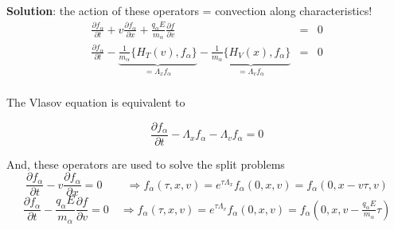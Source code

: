\documentclass{beamer}
\begin{document}

\begin{frame}{\subsecname}
\vspace*{-2mm} 
\textbf{Solution}: the action of these operators = convection along characteristics!
\begin{eqnarray*}
\frac{\partial f_{\alpha}}{\partial t} + v\frac{\partial f_{\alpha}}{\partial x} + \frac{q_{\alpha}E}{m_{\alpha}}\frac{\partial f}{\partial v} & = & 0 \\
\frac{\partial f_{\alpha}}{\partial t} - \underbrace{\frac{1}{m_{\alpha}}\{H_T(v),f_{\alpha}\}}_{= \Lambda_xf_{\alpha}} -  \underbrace{\frac{1}{m_{\alpha}}\{H_V(x),f_{\alpha}\}}_{= \Lambda_vf_{\alpha}}  & = & 0 \\
\end{eqnarray*}

\vspace*{-3.5mm}The Vlasov equation is equivalent to

$$\frac{\partial f_{\alpha}}{\partial t} - \Lambda_xf_{\alpha} -  \Lambda_vf_{\alpha}   =  0 $$

And, these operators are used to solve the split problems
$$\frac{\partial f_{\alpha}}{\partial t} - v\frac{\partial f_{\alpha}}{\partial x}  =  0  \qquad\, \Rightarrow  f_{\alpha}(\tau ,x,v) = e^{\tau \Lambda_x}f_{\alpha}(0,x,v) = f_{\alpha}(0,x-v\tau , v)$$
$$\frac{\partial f_{\alpha}}{\partial t} - \frac{q_{\alpha}E}{m_{\alpha}}\frac{\partial f}{\partial v} =  0  \quad \Rightarrow  f_{\alpha}(\tau ,x,v) = e^{\tau \Lambda_v}f_{\alpha}(0,x,v) = f_{\alpha}(0,x,v-\tfrac{q_{\alpha}E}{m_{\alpha}}\tau )$$
 

\end{frame}

\end{document}
